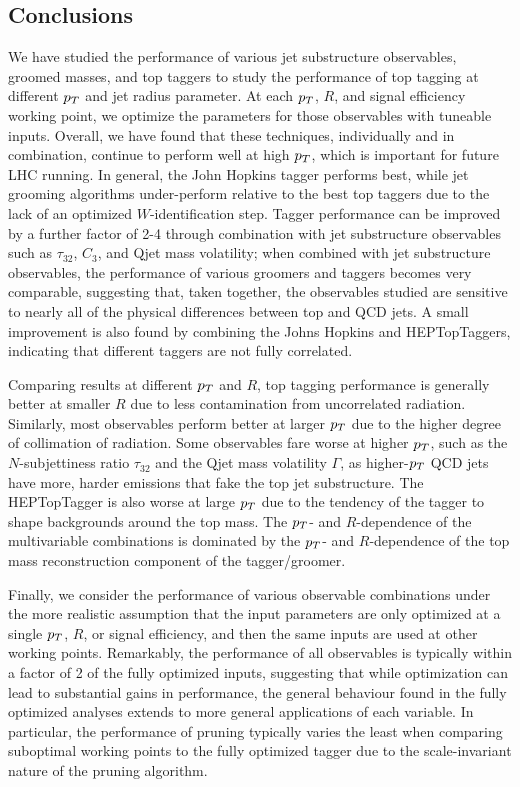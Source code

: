 \subsection{Conclusions}


We have studied the performance of various jet substructure observables, groomed masses, and top taggers to study the performance of top tagging at different $p_T$ and jet radius parameter. At each $p_T$, $R$, and signal efficiency working point, we optimize the parameters for those observables with tuneable inputs. Overall, we have found that these techniques, individually and in combination, continue to perform well at high $p_T$, which is important for future LHC running. In general, the John Hopkins tagger performs best, while jet grooming algorithms under-perform relative to the best top taggers due to the lack of an optimized $W$-identification step. Tagger performance can be improved by a further factor of 2-4 through combination with jet substructure observables such as $\tau_{32}$, $C_3$, and Qjet mass volatility; when combined with jet substructure observables, the performance of various groomers and taggers becomes very comparable, suggesting that, taken together, the observables studied are sensitive to nearly all of the physical differences between top and QCD jets. A small improvement is also found by combining the Johns Hopkins and HEPTopTaggers, indicating that different taggers are not fully correlated.

Comparing results at different $p_T$ and $R$, top tagging performance is generally better at smaller $R$ due to less contamination from uncorrelated radiation. Similarly, most observables perform better at larger $p_T$ due to the higher degree of collimation of radiation. Some observables fare worse at higher $p_T$, such as the $N$-subjettiness ratio $\tau_{32}$ and the Qjet mass volatility $\Gamma$, as higher-$p_T$ QCD jets have more, harder emissions that fake the top jet substructure. The HEPTopTagger is also worse at large $p_T$ due to the tendency of the tagger to shape backgrounds around the top mass. The $p_T$- and $R$-dependence of the multivariable combinations is dominated by the $p_T$- and $R$-dependence of the top mass reconstruction component of the tagger/groomer.

Finally, we consider the performance of various observable combinations under the more realistic assumption that the input parameters are only optimized at a single $p_T$, $R$, or signal efficiency, and then the same inputs are used at other working points. Remarkably, the performance of all observables is typically within a factor of 2 of the fully optimized inputs, suggesting that while optimization can lead to substantial gains in performance, the general behaviour found in the fully optimized analyses extends to more general applications of each variable. In particular, the performance of pruning typically varies the least when comparing suboptimal working points to the fully optimized tagger due to the scale-invariant nature of the pruning algorithm.







